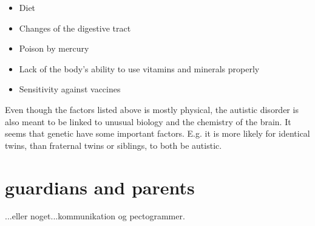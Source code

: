 \begin{itemize}
  
  \item{Diet}
  \item{Changes of the digestive tract}
  \item{Poison by mercury}
  \item{Lack of the body's ability to use vitamins and minerals properly}
  \item{Sensitivity against vaccines}
  
\end{itemize}

Even though the factors listed above is mostly physical, the autistic disorder is also meant to be linked to unusual biology and the chemistry of the brain.
It seems that genetic have some important factors. E.g. it is more likely for identical twins, than fraternal twins or siblings, to both be autistic.


\section{guardians and parents}
...eller noget...kommunikation og pectogrammer.